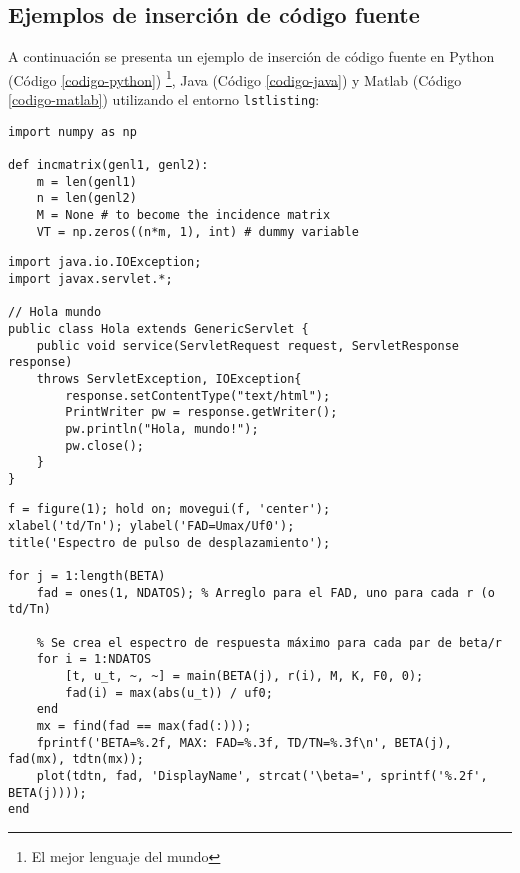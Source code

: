 		\lipsum[4]
		
		\begin{multicols}{2}
			
			\lipsum[4]
			
			
			\lipsum[1]
			
		\end{multicols}
		
	\subsection{Ejemplos de inserción de código fuente}
		
		A continuación se presenta un ejemplo de inserción de código fuente en Python (Código \ref{codigo-python}) \footnote{El mejor lenguaje del mundo}, Java (Código \ref{codigo-java}) y Matlab (Código \ref{codigo-matlab}) utilizando el entorno \texttt{lstlisting}: \\
		
\begin{lstlisting}[style=Python, caption={Ejemplo en Python.\label{codigo-python}}]
import numpy as np

def incmatrix(genl1, genl2):
	m = len(genl1)
	n = len(genl2)
	M = None # to become the incidence matrix
	VT = np.zeros((n*m, 1), int) # dummy variable
\end{lstlisting}

\begin{lstlisting}[style=Java, caption={Ejemplo en Java.\label{codigo-java}}]
import java.io.IOException; 
import javax.servlet.*;

// Hola mundo
public class Hola extends GenericServlet {
	public void service(ServletRequest request, ServletResponse response)
	throws ServletException, IOException{
		response.setContentType("text/html");
		PrintWriter pw = response.getWriter();
		pw.println("Hola, mundo!");
		pw.close();
	}
}
\end{lstlisting}

\begin{lstlisting}[style=Matlab, caption={Ejemplo en Matlab.\label{codigo-matlab}}]
% Se crea gráfico
f = figure(1); hold on; movegui(f, 'center');
xlabel('td/Tn'); ylabel('FAD=Umax/Uf0');
title('Espectro de pulso de desplazamiento');

for j = 1:length(BETA)
	fad = ones(1, NDATOS); % Arreglo para el FAD, uno para cada r (o td/Tn)
	
	% Se crea el espectro de respuesta máximo para cada par de beta/r
	for i = 1:NDATOS
		[t, u_t, ~, ~] = main(BETA(j), r(i), M, K, F0, 0);
		fad(i) = max(abs(u_t)) / uf0;
	end
	mx = find(fad == max(fad(:)));
	fprintf('BETA=%.2f, MAX: FAD=%.3f, TD/TN=%.3f\n', BETA(j), fad(mx), tdtn(mx));
	plot(tdtn, fad, 'DisplayName', strcat('\beta=', sprintf('%.2f', BETA(j))));
end
\end{lstlisting}


